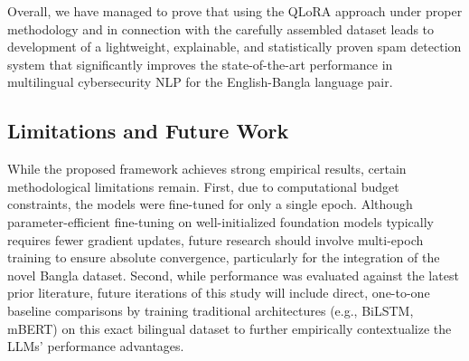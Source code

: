 \documentclass[journal]{IEEEtran}
\begin{document}
Overall, we have managed to prove that using the QLoRA approach under
proper methodology and in connection with the carefully assembled
dataset leads to development of a lightweight, explainable, and
statistically proven spam detection system that significantly improves
the state-of-the-art performance in multilingual cybersecurity NLP for
the English-Bangla language pair.

\subsection{Limitations and Future Work}
While the proposed framework achieves strong empirical results, certain methodological limitations remain. First, due to computational budget constraints, the models were fine-tuned for only a single epoch. Although parameter-efficient fine-tuning on well-initialized foundation models typically requires fewer gradient updates, future research should involve multi-epoch training to ensure absolute convergence, particularly for the integration of the novel Bangla dataset. Second, while performance was evaluated against the latest prior literature, future iterations of this study will include direct, one-to-one baseline comparisons by training traditional architectures (e.g., BiLSTM, mBERT) on this exact bilingual dataset to further empirically contextualize the LLMs' performance advantages.






\end{document}
